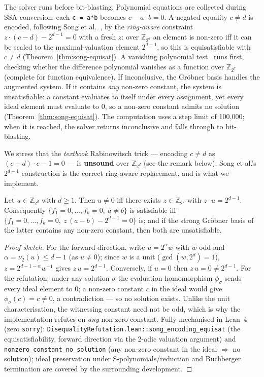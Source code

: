 \documentclass[runningheads]{llncs}
\begin{document}
The solver runs before bit-blasting. Polynomial equations are
collected during SSA conversion: each \texttt{c = a*b} becomes
$c - a \cdot b = 0$. A negated equality $c \neq d$ is encoded, following
Song et al.~\cite{song2024equational}, by the \emph{ring-aware}
constraint $z \cdot (c-d) - 2^{d-1} = 0$ with a fresh $z$: over
$\mathbb{Z}_{2^d}$ an element is non-zero iff it can be scaled to the
maximal-valuation element $2^{d-1}$, so this is equisatisfiable with
$c \neq d$ (Theorem~\ref{thm:song-equisat}). A vanishing polynomial
test~\cite{shekhar2007equivalence} runs first, checking whether the
difference polynomial vanishes as a function over $\mathbb{Z}_{2^d}$
(complete for function equivalence). If inconclusive, the Gr\"obner
basis handles the augmented system. If it contains \emph{any} non-zero
constant, the system is unsatisfiable: a constant evaluates to itself
under every assignment, yet every ideal element must evaluate to $0$,
so a non-zero constant admits no solution
(Theorem~\ref{thm:song-equisat}). The computation uses a step limit of
100,000; when it is reached, the solver returns inconclusive and falls
through to bit-blasting.

We stress that the \emph{textbook} Rabinowitsch trick --- encoding
$c \neq d$ as $(c-d)\cdot e - 1 = 0$ --- is \textbf{unsound} over
$\mathbb{Z}_{2^d}$ (see the remark below); Song et al.'s
$2^{d-1}$ construction is the correct ring-aware replacement, and is
what we implement.

\begin{theorem}
\label{thm:song-equisat}
Let $u \in \mathbb{Z}_{2^d}$ with $d \geq 1$. Then $u \neq 0$ iff
there exists $z \in \mathbb{Z}_{2^d}$ with $z \cdot u = 2^{d-1}$.
Consequently $\{f_1 = 0, \ldots, f_k = 0,\ a \neq b\}$ is satisfiable
iff $\{f_1 = 0, \ldots, f_k = 0,\ z\,(a{-}b) - 2^{d-1} = 0\}$ is; and
if the strong Gr\"obner basis of the latter contains any non-zero
constant, then both are unsatisfiable.
\end{theorem}

\begin{proof}[Proof sketch]
For the forward direction, write $u = 2^{\alpha} w$ with $w$ odd and
$\alpha = \nu_2(u) \leq d-1$ (as $u \neq 0$); since $w$ is a unit
($\gcd(w, 2^d) = 1$), $z = 2^{d-1-\alpha} w^{-1}$ gives
$z\,u = 2^{d-1}$. Conversely, if $u = 0$ then $z\,u = 0 \neq 2^{d-1}$.
For the refutation: under any solution $\sigma$ the evaluation
homomorphism $\phi_\sigma$ sends every ideal element to $0$; a
non-zero constant $c$ in the ideal would give $\phi_\sigma(c) = c \neq
0$, a contradiction --- so no solution exists. Unlike the unit
characterisation, the witnessing constant need not be odd, which is
why the implementation refutes on \emph{any} non-zero constant. Fully
mechanised in Lean~4 (zero \texttt{sorry}):
\texttt{DisequalityRefutation.lean::song\_encoding\_equisat} (the
equisatisfiability, forward direction via the 2-adic valuation
argument) and \texttt{nonzero\_constant\_no\_solution} (any non-zero
constant in the ideal $\Rightarrow$ no solution); ideal preservation
under S-polynomials/reduction and Buchberger termination are covered
by the surrounding development.
\end{proof}
\end{document}
